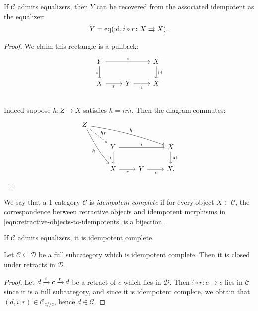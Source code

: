 \begin{proposition} If $\mathscr{C}$ admits equalizers, then $Y$ can be recovered from the associated idempotent as the equalizer:
\begin{align*}
    Y = \mathrm{eq} (\mathrm{id}, i\circ r \colon X \rightrightarrows X).
\end{align*}
\end{proposition}
\begin{proof} We claim this rectangle is a pullback:
\[ \begin{tikzcd}
    Y\dar["i" left]\ar[rr,"i" above] &  & X\dar["\id" right]\\
    X\rar["r" below] & Y\rar["i" below] & X\\
\end{tikzcd} \]
Indeed suppose $h \colon Z \to X$ satisfies $h = irh$. Then the diagram commutes:
\[ \begin{tikzcd}
Z\ar[ddr,"h" below left, bend right=5]\ar[drrr,"h" above right, bend left=5]\ar[dr,dashed,"hr" above right] & \\
    & Y\dar["i" left]\ar[rr,"i" above] &  & X\dar["\id" right]\\
    & X\rar["r" below] & Y\rar["i" below] & X.
\end{tikzcd} \]
\end{proof}

\begin{definition} We say that a 1-category $\mathscr{C}$ is \textit{idempotent complete} if for every object $X \in \mathscr{C}$, the correspondence between retractive objects and idempotent morphisms in \autoref{eqn:retractive-objects-to-idempotents} is a bijection.
\end{definition}

\begin{example} If $\mathscr{C}$ admits equalizers, it is idempotent complete.
\end{example}

\begin{proposition} Let $\mathscr{C} \subseteq \mathscr{D}$ be a full subcategory which is idempotent complete. Then it is closed under retracts in $\mathscr{D}$.
\end{proposition}
\begin{proof} Let $d \xrightarrow{i} c \xrightarrow{r} d$ be a retract of $c$ which lies in $\mathscr{D}$. Then $i\circ r \colon c \to c$ lies in $\mathscr{C}$ since it is a full subcategory, and since it is idempotent complete, we obtain that $(d,i,r) \in \mathscr{C}_{c // c}$, hence $d\in \mathscr{C}$.
\end{proof}

